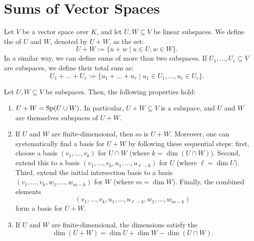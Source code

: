\renewcommand{\thetheorem}{14.\arabic{theorem}}
\setcounter{theorem}{0}
\setcounter{chapter}{13} %


\chapter{Sums of Vector Spaces}

\begin{definition}
\label{def:sum_of_subspaces}
Let $V$ be a vector space over $K$, and let $U, W \subseteq V$ be linear subspaces. We define the  of $U$ and $W$, denoted by $U + W$, as the set:
\[
U + W := \{u + w \mid u \in U, w \in W\}.
\]
In a similar way, we can define sums of more than two subspaces. If $U_1, \dots, U_r \subseteq V$ are subspaces, we define their total sum as:
\[
U_1 + \dots + U_r := \{u_1 + \dots + u_r \mid u_1 \in U_1, \dots, u_r \in U_r\}.
\]
\end{definition}

\begin{proposition}
\label{prop:properties_of_sums}
Let $U, W \subseteq V$ be subspaces. Then, the following properties hold:
\begin{enumerate}[label=\textbf{(\alph*)}]
    \item $U + W = \operatorname{Sp}(U \cup W)$. In particular, $U + W \subseteq V$ is a subspace, and $U$ and $W$ are themselves subspaces of $U + W$.
    \item If $U$ and $W$ are finite-dimensional, then so is $U + W$. Moreover, one can systematically find a basis for $U + W$ by following these sequential steps: first, choose a basis $(v_1, \dots, v_k)$ for $U \cap W$ (where $k = \dim(U \cap W)$). Second, extend this to a basis $(v_1, \dots, v_k, u_1, \dots, u_{\ell-k})$ for $U$ (where $\ell = \dim U$). Third, extend the initial intersection basis to a basis $(v_1, \dots, v_k, w_1, \dots, w_{m-k})$ for $W$ (where $m = \dim W$). Finally, the combined elements 
    \[(v_1, \dots, v_k, u_1, \dots, u_{\ell-k}, w_1, \dots, w_{m-k})\] 
    form a basis for $U + W$.
    \item \label{item:dimension_formula_sums} If $U$ and $W$ are finite-di\-men\-sional, the dimensions satisfy the 
    \[
    \dim(U + W) = \dim U + \dim W - \dim(U \cap W).
    \]
\end{enumerate}
\end{proposition}

